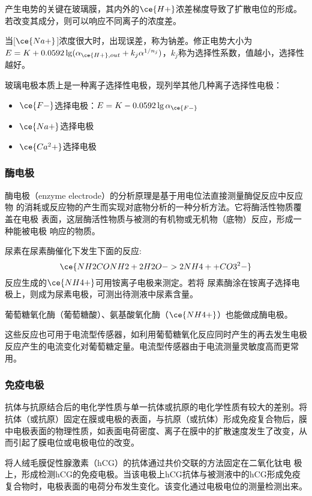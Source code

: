 产生电势的关键在玻璃膜，其内外的$\ce{H+}$浓差梯度导致了扩散电位的形成。若改变其成分，则可以响应不同离子的浓度差。

当[$\ce{Na+}$]浓度很大时，出现误差，称为钠差。修正电势大小为$E=K+0.0592\lg ( {\alpha_{\ce{H+},out}}+k_j\alpha^{1/n_j})$，$k_j$称为选择性系数，值越小，选择性越好。

玻璃电极本质上是一种离子选择性电极，现列举其他几种离子选择性电极：
\begin{itemize}
	\item $\ce{F-}$选择电极：$E=K-0.0592\lg {\alpha_{\ce{F-}}}$
	\item $\ce{Na+}$选择电极
	\item $\ce{Ca^2+}$选择电极
\end{itemize}

\subsubsection{酶电极}
酶电极（enzyme electrode）的分析原理是基于用电位法直接测量酶促反应中反应物
的消耗或反应物的产生而实现对底物分析的一种分析方法。它将酶活性物质覆盖在电极
表面，这层酶活性物质与被测的有机物或无机物（底物）反应，形成一种能被电极
响应的物质。
\begin{example}
	尿素在尿素酶催化下发生下面的反应:
	$$\ce{NH2CONH2 + 2H2O -> 2NH4+ + CO3^2-}$$
	反应生成的$\ce{NH4+}$可用铵离子电极来测定。若将
	尿素酶涂在铵离子选择电极上，则成为尿素电极，可测出待测液中尿素含量。
	
	葡萄糖氧化酶（葡萄糖酸）、氨基酸氧化酶（$\ce{NH4+}$）也能做成酶电极。
\end{example}

\begin{note}
	这些反应也可用于电流型传感器，如利用葡萄糖氧化反应同时产生的再去发生电极反应产生的电流变化对葡萄糖定量。电流型传感器由于电流测量灵敏度高而更常用。
\end{note}

\subsubsection{免疫电极}
抗体与抗原结合后的电化学性质与单一抗体或抗原的电化学性质有较大的差别。将抗体（或抗原）固定在膜或电极的表面，与抗原（或抗体）形成免疫复合物后，膜中电极表面的物理性质，如表面电荷密度、离子在膜中的扩散速度发生了改变，从而引起了膜电位或电极电位的改变。
\begin{example}
	将人绒毛膜促性腺激素（hCG）的抗体通过共价交联的方法固定在二氧化钛电
	极上，形成检测hCG的免疫电极。当该电极上hCG抗体与被测液中的hCG形成免疫复合物时，电极表面的电荷分布发生变化。该变化通过电极电位的测量检测出来。
\end{example}


